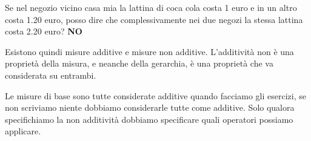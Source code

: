 \begin{itemize}
\begin{info}[Esempio:]
		\newline Se nel negozio vicino casa mia la lattina di coca cola costa 1 euro e in un altro costa 1.20 euro, posso dire che complessivamente nei due negozi la stessa lattina costa 2.20 euro? \textbf{NO}\newline
	\end{info}
	Esistono quindi misure additive e misure non additive. L'additività non è una proprietà della misura, e neanche della gerarchia, è una proprietà che va considerata su entrambi.
	\begin{warn}
		Le misure di base sono tutte considerate additive quando facciamo gli esercizi, se non scriviamo niente dobbiamo considerarle tutte come additive. Solo qualora specifichiamo la non additività dobbiamo specificare quali operatori possiamo applicare.
	\end{warn}
\end{itemize}
